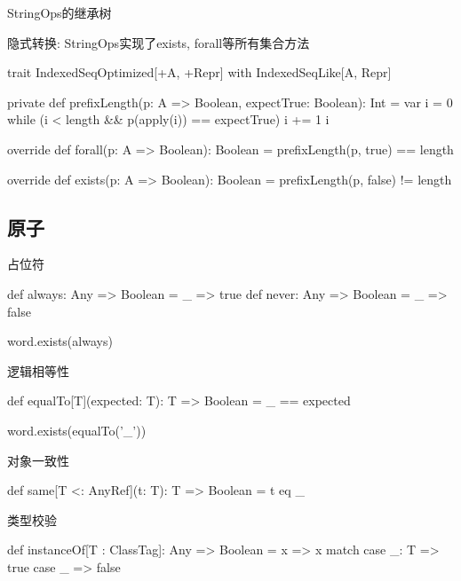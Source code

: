 \begin{frame}[fragile]{StringOps的继承树}
 \begin{block}{隐式转换: StringOps实现了exists, forall等所有集合方法}
  \begin{scala}
trait IndexedSeqOptimized[+A, +Repr] with IndexedSeqLike[A, Repr] {  
  private def prefixLength(p: A => Boolean, expectTrue: Boolean): Int = {
    var i = 0
    while (i < length && p(apply(i)) == expectTrue) i += 1
    i
  }

  override def forall(p: A => Boolean): Boolean = 
    prefixLength(p, true) == length
  
  override def exists(p: A => Boolean): Boolean = 
    prefixLength(p, false) != length
}
  \end{scala}
 \end{block}
\end{frame}

\subsection{原子}

\begin{frame}[fragile]{占位符}
  \begin{scala}
def always: Any => Boolean = _ => true
def never:  Any => Boolean = _ => false  

word.exists(always)
  \end{scala}
\end{frame}

\begin{frame}[fragile]{逻辑相等性}
  \begin{scala}
def equalTo[T](expected: T): T => Boolean = _ == expected

word.exists(equalTo('_'))
  \end{scala}
\end{frame}

\begin{frame}[fragile]{对象一致性}
  \begin{scala}
def same[T <: AnyRef](t: T): T => Boolean = t eq _
  \end{scala}
\end{frame}

\begin{frame}[fragile]{类型校验}
  \begin{scala}
def instanceOf[T : ClassTag]: Any => Boolean = x =>
  x match {
    case _: T => true
    case _    => false
  }
  \end{scala}
\end{frame}

